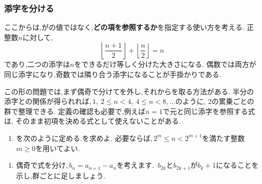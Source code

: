   \subsubsection{添字を分ける}\label{節：ガウス型の添字の分割}
    ここからは,がの値ではなく,\textbf{どの項を参照するか}を指定する使い方を考える.
    正整数$n$に対して,
    \[
      \left\lfloor\frac{n+1}{2}\right\rfloor
      +\left\lfloor\frac n2\right\rfloor=n
    \]
    であり,二つの添字は$n$をできるだけ等しく分けた大きさになる.
    偶数では両方が同じ添字になり,奇数では隣り合う添字になることが手掛かりである.

    この形の問題では,まず偶奇で分けてを外し,それからを取る方法がある.
    半分の添字との関係が得られれば,\,$1,\ 2\le n<4,\ 4\le n<8,\ldots$のように,
    2の累乗ごとの群で整理できる.
    定義の確認も必要で,例えば$n=1$で元と同じ添字を参照する式は,
    そのまま初項を決める式として使えないことがある.

    \noindent {}\par\nobreak
    \begin{enumerate}[label=(\arabic*),parsep=3pt,beginpenalty=10000,format=\bookitemlink{example-gauss-role-7}{problem}{answer}]
      \item {}を次のように定める.を求めよ.
\BookMathLayout{            \[
              a_1=2,\qquad
              a_n=a_{\left\lfloor\frac{n+1}{2}\right\rfloor}
                  +a_{\left\lfloor\frac n2\right\rfloor}+n-1
              \quad(n\ge2).
            \]}{            \[
              \begin{aligned}
              a_1&=2,\\
              a_n&=a_{\left\lfloor\frac{n+1}{2}\right\rfloor}
                  +a_{\left\lfloor\frac n2\right\rfloor}+n-1
              \\              &\quad(n\ge2).
              \end{aligned}
            \]}
            必要ならば,\,$2^m\le n<2^{m+1}$を満たす整数$m\ge0$を用いてよい.
    \end{enumerate}

    \noindent {}\par\nobreak
    \begin{enumerate}[label=(\arabic*),parsep=3pt,beginpenalty=10000,format=\bookitemlink{example-gauss-role-7}{hint}{problem}]
      \item 偶奇で式を分け,\,$b_n=a_{n+1}-a_n$を考えます.
            \,$b_{2k}$と$b_{2k+1}$が$b_k+1$になることを示し,群ごとに足しましょう.
    \end{enumerate}

